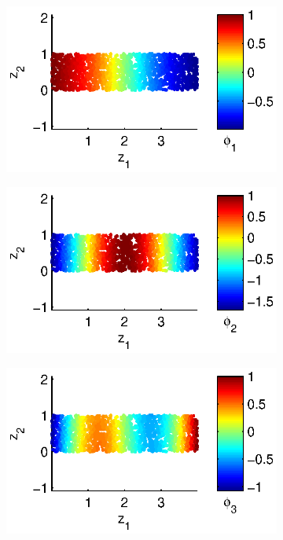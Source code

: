 \documentclass[3p]{elsarticle}
\begin{document}
\begin{figure}[t]
\centering
\begin{subfigure}{0.24\textwidth}
\includegraphics[width=\textwidth]{strip_discrete1}
\end{subfigure}
%
\begin{subfigure}{0.24\textwidth}
\includegraphics[width=\textwidth]{strip_discrete2}
\end{subfigure}
%
\begin{subfigure}{0.24\textwidth}
\includegraphics[width=\textwidth]{strip_discrete3}

\end{subfigure}
\end{figure}
\end{document}
